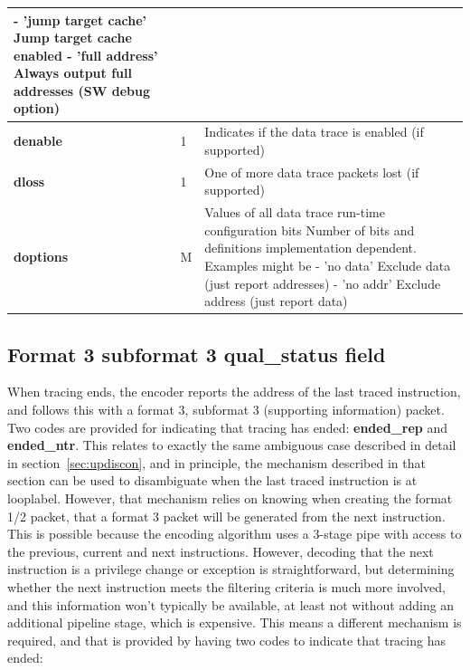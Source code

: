 \begin{table}[htp]
\begin{tabulary}{\textwidth}{|l|p{35mm}|p{90mm}|}
       - 'jump target cache' Jump target cache enabled\newline
       - 'full address' Always output full addresses (SW debug option)\\
       \hline
     \textbf{denable} & 1 & Indicates if the data trace is enabled (if supported)\\
       \hline
     \textbf{dloss} & 1 & One of more data trace packets lost (if supported)\\
       \hline
     \textbf{doptions} & M & Values of all data trace run-time configuration bits\newline
       Number of bits and definitions implementation dependent.  Examples might be\newline
       - 'no data' Exclude data (just report addresses)\newline
       - 'no addr' Exclude address (just report data)\\
       \hline
  \end{tabulary}
\end{table}

\subsection{Format 3 subformat 3 \textbf{qual\_status} field} \label{sec:qual-status}

When tracing ends, the encoder reports the address of the last traced instruction, and follows this with a format 3, 
subformat 3 (supporting information) packet.  Two codes are provided for indicating that tracing has ended: 
\textbf{ended\_rep} and \textbf{ended\_ntr}.  This relates to exactly the same ambiguous case described in detail in 
section~\ref{sec:updiscon}, and in principle, the mechanism described in that section can be used to disambiguate when the last traced
instruction is at looplabel.  However, that mechanism relies on knowing when creating the format 1/2 packet, that 
a format 3 packet will be generated from the next instruction.  This is possible because the encoding algorithm uses 
a 3-stage pipe with access to the previous, current and next instructions.  However, decoding that the next instruction
is a privilege change or exception is straightforward, but determining whether the next instruction meets the filtering
criteria is much more involved, and this information won't typically be available, at least not without adding an
additional pipeline stage, which is expensive.  This means a different mechanism is required, and that is provided
by having two codes to indicate that tracing has ended:

